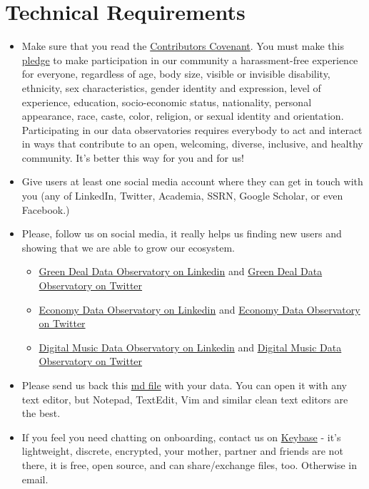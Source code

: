 \documentclass[
  a4paper,
  openany, a4paper, oneside]{book}
\providecommand{\tightlist}{%
  \setlength{\itemsep}{0pt}\setlength{\parskip}{0pt}}
\begin{document}
\hypertarget{technical-requirements-associate}{%
\section{Technical Requirements}\label{technical-requirements-associate}}

\begin{itemize}
\item
  Make sure that you read the \href{https://www.contributor-covenant.org/}{Contributors Covenant}. You must make this \href{https://www.contributor-covenant.org/version/2/0/code_of_conduct/}{pledge} to make participation in our community a harassment-free experience for everyone, regardless of age, body size, visible or invisible disability, ethnicity, sex characteristics, gender identity and expression, level of experience, education, socio-economic status, nationality, personal appearance, race, caste, color, religion, or sexual identity and orientation. Participating in our data observatories requires everybody to act and interact in ways that contribute to an open, welcoming, diverse, inclusive, and healthy community. It's better this way for you and for us!
\item
  Give users at least one social media account where they can get in touch with you (any of LinkedIn, Twitter, Academia, SSRN, Google Scholar, or even Facebook.)
\item
  Please, follow us on social media, it really helps us finding new users and showing that we are able to grow our ecosystem.

  \begin{itemize}
  \tightlist
  \item
    \href{https://www.linkedin.com/company/78556699}{Green Deal Data Observatory on Linkedin} and \href{https://twitter.com/GreenDealObs}{Green Deal Data Observatory on Twitter}
  \item
    \href{https://www.linkedin.com/company/78562153}{Economy Data Observatory on Linkedin} and \href{https://twitter.com/GreenDealObs}{Economy Data Observatory on Twitter}
  \item
    \href{https://www.linkedin.com/company/reprexbv/}{Digital Music Data Observatory on Linkedin} and \href{https://twitter.com/dataandlyrics}{Digital Music Data Observatory on Twitter}
  \end{itemize}
\item
  Please send us back this \href{https://greendeal.dataobservatory.eu/media/documents/bio_template.md}{md file} with your data. You can open it with any text editor, but Notepad, TextEdit, Vim and similar clean text editors are the best.
\item
  If you feel you need chatting on onboarding, contact us on \href{https://curators.dataobservatory.eu/tools.html\#keybase}{Keybase} - it's lightweight, discrete, encrypted, your mother, partner and friends are not there, it is free, open source, and can share/exchange files, too. Otherwise in email.
\end{itemize}
\end{document}
